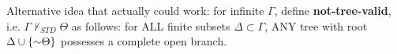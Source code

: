 \documentclass[12pt]{memoir}
\begin{document}
\begin{enumerate}[1.)]
Alternative idea that actually could work: for infinite $\Gamma$, define \textbf{not-tree-valid}, i.e. $\Gamma \nvdash_{STD} \Theta$ as follows: for ALL finite subsets $\Delta \subset \Gamma$, ANY tree with root $\Delta \cup \{\enot \Theta \}$ possesses a complete open branch. 



\iffalse

\item  %
\begin{equation*}
\begin{nd}
	\hypo{1}{Gb \eif Fb} \pr{}
	\hypo{2}{Gb} \pr{}
	\have{3}{Fb} \ce{1, 2}
	\have{4}{Fb \eor Hb} \oi{3}
	\have{5}{\qt{\exists}{x}(Fx \eor Hx)} \Ei{4}
\end{nd}
\end{equation*}

\fi 











\end{enumerate}
\end{document}
